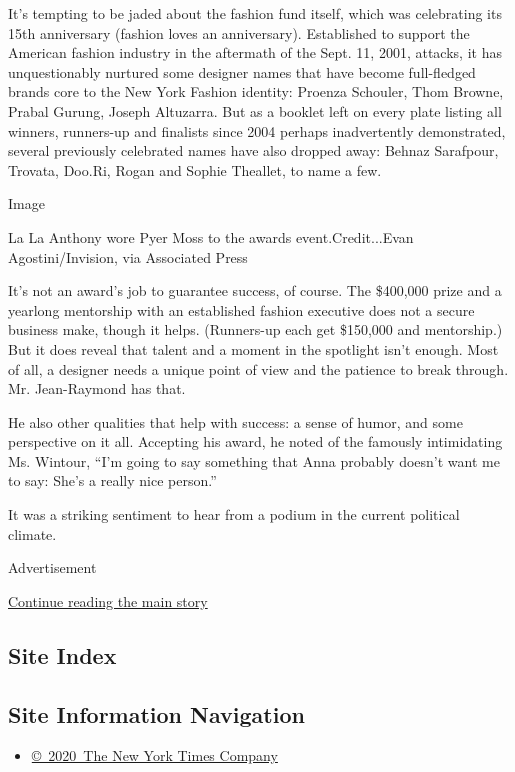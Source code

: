 It's tempting to be jaded about the fashion fund itself, which was
celebrating its 15th anniversary (fashion loves an anniversary).
Established to support the American fashion industry in the aftermath of
the Sept. 11, 2001, attacks, it has unquestionably nurtured some
designer names that have become full-fledged brands core to the New York
Fashion identity: Proenza Schouler, Thom Browne, Prabal Gurung, Joseph
Altuzarra. But as a booklet left on every plate listing all winners,
runners-up and finalists since 2004 perhaps inadvertently demonstrated,
several previously celebrated names have also dropped away: Behnaz
Sarafpour, Trovata, Doo.Ri, Rogan and Sophie Theallet, to name a few.

Image

La La Anthony wore Pyer Moss to the awards event.Credit...Evan
Agostini/Invision, via Associated Press

It's not an award's job to guarantee success, of course. The \$400,000
prize and a yearlong mentorship with an established fashion executive
does not a secure business make, though it helps. (Runners-up each get
\$150,000 and mentorship.) But it does reveal that talent and a moment
in the spotlight isn't enough. Most of all, a designer needs a unique
point of view and the patience to break through. Mr. Jean-Raymond has
that.

He also other qualities that help with success: a sense of humor, and
some perspective on it all. Accepting his award, he noted of the
famously intimidating Ms. Wintour, ``I'm going to say something that
Anna probably doesn't want me to say: She's a really nice person.''

It was a striking sentiment to hear from a podium in the current
political climate.

Advertisement

\protect\hyperlink{after-bottom}{Continue reading the main story}

\hypertarget{site-index}{%
\subsection{Site Index}\label{site-index}}

\hypertarget{site-information-navigation}{%
\subsection{Site Information
Navigation}\label{site-information-navigation}}

\begin{itemize}
\tightlist
\item
  \href{https://help.nytimes3xbfgragh.onion/hc/en-us/articles/115014792127-Copyright-notice}{©~2020~The
  New York Times Company}
\end{itemize}

